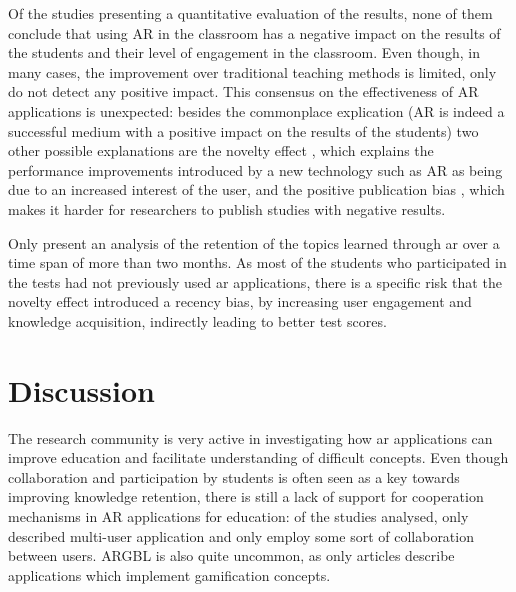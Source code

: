 Of the \papersWithEvaluation studies presenting a quantitative evaluation of the results, none of them conclude that using AR in the classroom has a negative impact on the results of the students and their level of engagement in the classroom. Even though, in many cases, the improvement over traditional teaching methods is limited, only \cite{carlos2020voluminis} do not detect any positive impact. This consensus on the effectiveness of AR applications is unexpected: besides the commonplace explication (AR is indeed a successful medium with a  positive impact on the results of the students) two other possible explanations are the novelty effect \citep{pisapia1993learning}, which explains the performance improvements introduced by a new technology such as AR as being due to an increased interest of the user, and the positive publication bias \citep{begg1994publication}, which makes it harder for researchers to publish studies with negative results.

Only \cite{lin2016effect, gargrish2022evaluation} present an analysis of the retention of the topics learned through \gls{ar} over a time span of more than two months. As most of the students who participated in the tests had not previously used \gls{ar} applications, there is a specific risk that the novelty effect introduced a recency bias, by increasing user engagement and knowledge acquisition, indirectly leading to better test scores.

\section{Discussion} \label{sec:discussion}
The research community is very active in investigating how \gls{ar} applications can improve education and facilitate understanding of difficult concepts.
Even though collaboration and participation by students is often seen as a key towards improving knowledge retention, there is still a lack of support for cooperation mechanisms in AR applications for education: of the \papersSelected studies analysed, only \papersMultiuser described multi-user application and only \papersCollab employ some sort of collaboration between users. \gls{ARGBL} is also quite uncommon, as only \papersGames articles describe applications which implement gamification concepts. 

